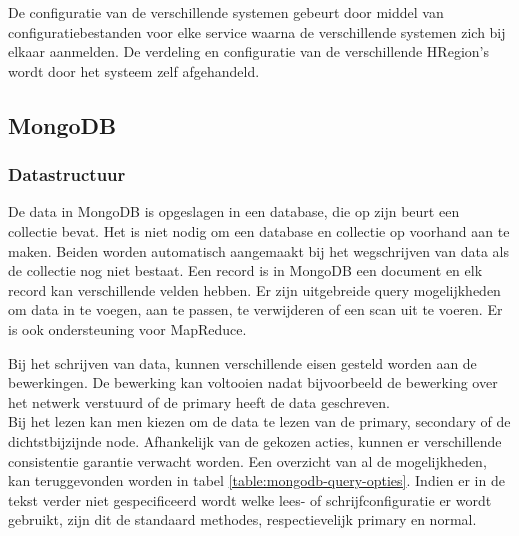 De configuratie van de verschillende systemen gebeurt door middel van configuratiebestanden voor elke service waarna de verschillende systemen zich bij elkaar aanmelden. De verdeling en configuratie van de verschillende HRegion's wordt door het systeem zelf afgehandeld.  

\subsection{MongoDB\cite{mongodb-manual}}

\subsubsection{Datastructuur}
De data in MongoDB is opgeslagen in een database, die op zijn beurt een collectie bevat. Het is niet nodig om een database en collectie op voorhand aan te maken. Beiden worden automatisch aangemaakt bij het wegschrijven van data als de collectie nog niet bestaat. Een record is in MongoDB een document en elk record kan verschillende velden hebben. Er zijn uitgebreide query mogelijkheden om data in te voegen, aan te passen, te verwijderen of een scan uit te voeren. Er is ook ondersteuning voor MapReduce\cite{dean2008mapreduce}. 

Bij het schrijven van data, kunnen verschillende eisen gesteld worden aan de bewerkingen. De bewerking kan voltooien nadat bijvoorbeeld de bewerking over het netwerk verstuurd of de primary heeft de data geschreven. \\ Bij het lezen kan men kiezen om de data te lezen van de primary, secondary of de dichtstbijzijnde node. Afhankelijk van de gekozen acties, kunnen er verschillende consistentie garantie verwacht worden. Een overzicht van al de mogelijkheden, kan teruggevonden worden in tabel \ref{table:mongodb-query-opties}. Indien er in de tekst verder niet gespecificeerd wordt welke lees- of schrijfconfiguratie er wordt gebruikt, zijn dit de standaard methodes, respectievelijk primary en normal. 

